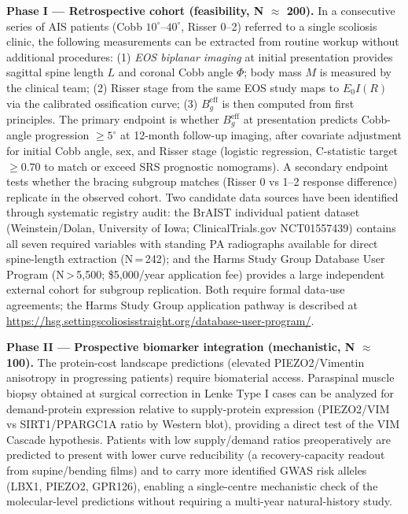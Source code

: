 \textbf{Phase I — Retrospective cohort (feasibility, N $\approx$ 200).}
In a consecutive series of AIS patients (Cobb $10^\circ$--$40^\circ$, Risser 0--2) referred to a single scoliosis clinic, the following measurements can be extracted from routine workup without additional procedures: (1) \emph{EOS biplanar imaging} at initial presentation provides sagittal spine length $L$ and coronal Cobb angle $\Phi$; body mass $M$ is measured by the clinical team; (2) Risser stage from the same EOS study maps to $E_0 I(R)$ via the calibrated ossification curve; (3) $B_g^{\mathrm{eff}}$ is then computed from first principles. The primary endpoint is whether $B_g^{\mathrm{eff}}$ at presentation predicts Cobb-angle progression $\geq 5^\circ$ at 12-month follow-up imaging, after covariate adjustment for initial Cobb angle, sex, and Risser stage (logistic regression, C-statistic target $\geq 0.70$ to match or exceed SRS prognostic nomograms). A secondary endpoint tests whether the bracing subgroup matches (Risser 0 vs 1--2 response difference) replicate in the observed cohort. Two candidate data sources have been identified through systematic registry audit: the BrAIST individual patient dataset (Weinstein/Dolan, University of Iowa; ClinicalTrials.gov NCT01557439) contains all seven required variables with standing PA radiographs available for direct spine-length extraction (N\,=\,242); and the Harms Study Group Database User Program (N\,>\,5{,}500; \$5{,}000/year application fee) provides a large independent external cohort for subgroup replication. Both require formal data-use agreements; the Harms Study Group application pathway is described at \url{https://hsg.settingscoliosisstraight.org/database-user-program/}.

\textbf{Phase II — Prospective biomarker integration (mechanistic, N $\approx$ 100).}
The protein-cost landscape predictions (elevated PIEZO2/Vimentin anisotropy in progressing patients) require biomaterial access. Paraspinal muscle biopsy obtained at surgical correction in Lenke Type I cases can be analyzed for demand-protein expression relative to supply-protein expression (PIEZO2/VIM vs SIRT1/PPARGC1A ratio by Western blot), providing a direct test of the VIM Cascade hypothesis. Patients with low supply/demand ratios preoperatively are predicted to present with lower curve reducibility (a recovery-capacity readout from supine/bending films) and to carry more identified GWAS risk alleles (LBX1, PIEZO2, GPR126), enabling a single-centre mechanistic check of the molecular-level predictions without requiring a multi-year natural-history study.

